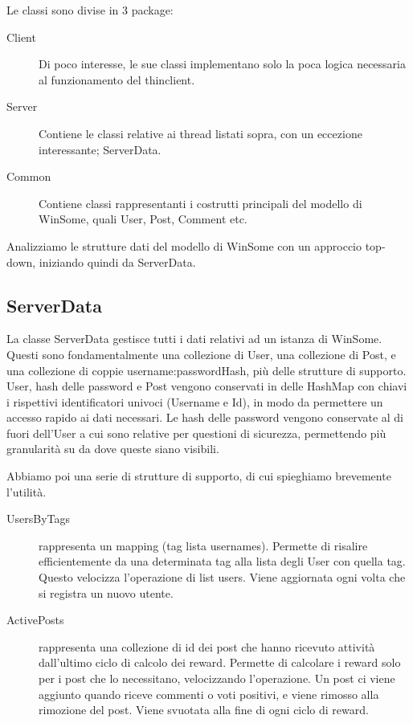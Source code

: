 \documentclass[11pt]{article}
\begin{document}
\begin{flushleft}
Le classi sono divise in 3 package:

\begin{description}

\item[Client] Di poco interesse, le sue classi implementano solo la poca logica necessaria al funzionamento del thinclient.

\item[Server] Contiene le classi relative ai thread listati sopra, con un eccezione interessante; ServerData.

\item[Common] Contiene classi rappresentanti i costrutti principali del modello di WinSome, quali User, Post, Comment etc.

\end{description}

Analizziamo le strutture dati del modello di WinSome con un approccio top-down, iniziando quindi da ServerData.

\subsection{ServerData}

La classe ServerData gestisce tutti i dati relativi ad un istanza di WinSome. Questi sono fondamentalmente una collezione di User, una collezione di Post, e una collezione di coppie username:passwordHash, più delle strutture di supporto.
User, hash delle password e Post vengono conservati in delle HashMap con chiavi i rispettivi identificatori univoci (Username e Id), in modo da permettere un accesso rapido ai dati necessari.
Le hash delle password vengono conservate al di fuori dell'User a cui sono relative per questioni di sicurezza, permettendo più granularità su da dove queste siano visibili.

Abbiamo poi una  serie di strutture di supporto, di cui spieghiamo brevemente l'utilità.

\begin{description}

\item[UsersByTags] rappresenta un mapping (tag \textrightarrow  \space lista usernames). Permette di risalire efficientemente da una determinata tag alla lista degli User con quella tag. Questo velocizza l'operazione di list users. Viene aggiornata ogni volta che si registra un nuovo utente.

\item[ActivePosts] rappresenta una collezione di id dei post che hanno ricevuto attività dall'ultimo ciclo di calcolo dei reward. Permette di calcolare i reward solo per i post che lo necessitano, velocizzando l'operazione. Un post ci viene aggiunto quando riceve commenti o voti positivi, e viene rimosso alla rimozione del post. Viene svuotata alla fine di ogni ciclo di reward.


\end{description}
\end{flushleft}
\end{document}
